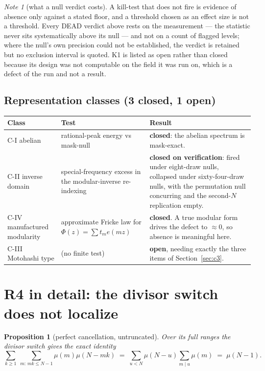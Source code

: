 \documentclass[11pt,a4paper]{article}
\theoremstyle{plain}
\newtheorem{proposition}[theorem]{Proposition}
\theoremstyle{definition}
\theoremstyle{remark}
\newtheorem{note}[theorem]{Note}
\begin{document}
\begin{note}[what a null verdict costs]\label{note:nullcost}
A kill-test that does not fire is evidence of absence only against a
stated floor, and a threshold chosen as an effect size is not a
threshold. Every DEAD verdict above rests on the measurement --- the
statistic never sits systematically above its null --- and not on a
count of flagged levels; where the null's own precision could not be
established, the verdict is retained but no exclusion interval is
quoted. K1 is listed as open rather than closed because its design was
not computable on the field it was run on, which is a defect of the
run and not a result.
\end{note}

\subsection{Representation classes (3 closed, 1 open)}

\begin{longtable}{p{}p{}p{}}
\hline
Class & Test & Result\\
\hline
\endhead
C-I abelian & rational-peak energy vs mask-null &
 \textbf{closed}: the abelian spectrum is mask-exact.\\
C-II inverse domain & special-frequency excess in the modular-inverse
 re-indexing &
 \textbf{closed on verification}: fired under eight-draw nulls,
 collapsed under sixty-four-draw nulls, with the permutation null
 concurring and the second-$N$ replication empty.\\
C-IV manufactured modularity & approximate Fricke law for
 $\Phi(z)=\sum t_me(mz)$ &
 \textbf{closed}. A true modular form drives the defect to
 $\approx0$, so absence is meaningful here.\\
C-III Motohashi type & (no finite test) &
 \textbf{open}, needing exactly the three items of
 Section~\ref{sec:c3}.\\
\hline
\end{longtable}

\section{R4 in detail: the divisor switch does not localize}%
\label{sec:R4}

\begin{proposition}[perfect cancellation, untruncated]\label{prop:R4}
Over its full ranges the divisor switch gives the exact identity
\[
  \sum_{k\ge1}\ \sum_{m:\,mk\le N-1}\mu(m)\mu(N-mk)
  \;=\;\sum_{u<N}\mu(N-u)\sum_{m\mid u}\mu(m)
  \;=\;\mu(N-1).
\]
\end{proposition}
\end{document}
